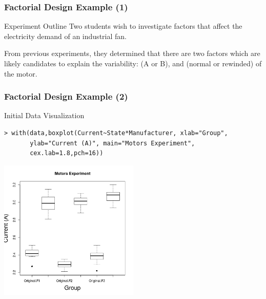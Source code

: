 \documentclass[10pt]{beamer}
\begin{document}
\begin{frame}
  \frametitle{Factorial Design Example (1)} 
  \begin{block}{Experiment Outline}
    Two students wish to investigate factors that affect the
    electricity demand of an industrial fan.
  \end{block}
  \begin{block}{}
    From previous experiments, they determined that there are two
    factors which are likely candidates to explain the variability:
     (A or B), and  (normal
    or rewinded) of the motor.
  \end{block}
\end{frame}

\begin{frame}
  \frametitle{Factorial Design Example (2)}
  \begin{center}
    Initial Data Visualization
  \end{center}
{\small
\begin{verbatim}
> with(data,boxplot(Current~State*Manufacturer, xlab="Group", 
       ylab="Current (A)", main="Motors Experiment", 
       cex.lab=1.8,pch=16))
\end{verbatim}
}

\includegraphics[width=0.5\textwidth]{img/fatorial1}

\end{frame}
\end{document}
